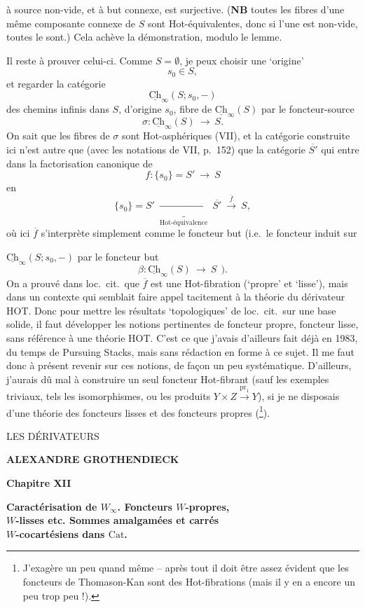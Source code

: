\documentclass[11pt]{article}
\newcommand{\printedpage}[1]{\marginpar{\footnotesize p.~#1}}
\newcommand{\msp}[1]{\marginpar{\footnotesize [#1]}}
\newcommand{\Cat}{\mathrm{Cat}}
\newcommand{\Ch}{\underline{\mathrm{Ch}}}
\begin{document}
\msp{page 135}

à source non-vide, et à but connexe, est surjective. (\textbf{NB} toutes les fibres d'une même composante connexe de $S$ sont Hot-équivalentes, donc si l'une est non-vide, toutes le sont.) Cela achève la démonstration, modulo le lemme.

Il reste à prouver celui-ci. Comme $S = \emptyset$, je peux choisir une ‘origine’
\[
s_0 \in S,
\]
et regarder la catégorie
\[
\Ch_{\infty}(S; s_0, -)
\]
des chemins infinis dans $S$, d'origine $s_0$, fibre de $\Ch_{\infty}(S)$ par le foncteur-source
\[
\sigma : \Ch_{\infty}(S) \ \longrightarrow\ S.
\]
On sait que les fibres de $\sigma$ sont Hot-asphériques (VII), et la catégorie construite ici n'est autre que (avec les notations de VII, p.~152) que la catégorie $\overline{S'}$ qui entre dans la factorisation canonique de
\[
f : \{s_0\} = S' \ \longrightarrow\ S
\]
en
\[
\{s_0\} = S' \ \underbrace{\longrightarrow}_{\text{Hot-équivalence}}\ \overline{S'} \ \xrightarrow{\ \overline{f}\ }\ S,
\]
où ici $\overline{f}$ s'interprète simplement comme le foncteur but (i.e.\ le foncteur induit sur

\msp{page 136}

$\Ch_{\infty}(S; s_0, -)$ par le foncteur but
\[
\beta : \Ch_{\infty}(S) \ \longrightarrow\ S \ \ ).
\]
On a prouvé dans loc.\ cit.\ que $\overline{f}$ est une Hot-fibration (‘propre’ et ‘lisse’), mais dans un contexte qui semblait faire appel tacitement à la théorie du dérivateur HOT. Donc pour mettre les résultats ‘topologiques’ de loc.\ cit.\ sur une base solide, il faut développer les notions pertinentes de foncteur propre, foncteur lisse, sans référence à une théorie HOT. C'est ce que j'avais d'ailleurs fait déjà en 1983, du temps de Pursuing Stacks, mais sans rédaction en forme à ce sujet. Il me faut donc à présent revenir sur ces notions, de façon un peu systématique. D'ailleurs, j'aurais dû mal à construire un seul foncteur Hot-fibrant (sauf les exemples triviaux, tels les isomorphismes, ou les produits $Y \times Z \xrightarrow{\mathrm{pr}_1} Y$), si je ne disposais d'une théorie des foncteurs lisses et des foncteurs propres (\footnote{J'exagère un peu quand même -- après tout il doit être assez évident que les foncteurs de Thomason-Kan sont des Hot-fibrations (mais il y en a encore un peu trop peu !).}). %

\printedpage{--}

\begin{center}
{\Large \textsf{LES DÉRIVATEURS}}

\bigskip

\textbf{ALEXANDRE GROTHENDIECK}

\bigskip\bigskip

\textbf{Chapitre XII}

\medskip

\textbf{Caractérisation de $W_\infty$. Foncteurs $W$-propres,\\
$W$-lisses etc. Sommes amalgamées et carrés\\
$W$-cocartésiens dans $\Cat$.}
\end{center}
\end{document}
